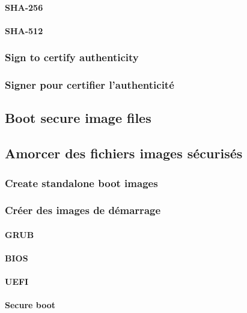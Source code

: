 \paragraph{SHA-256}

\paragraph{SHA-512}

\ml
{\subsubsection{Sign to certify authenticity}}
{\subsubsection{Signer pour certifier l’authenticité}}

\ml
{\subsection{Boot secure image files}}
{\subsection{Amorcer des fichiers images sécurisés}}

\ml
{\subsubsection{Create standalone boot images}}
{\subsubsection{Créer des images de démarrage}}

\paragraph{GRUB}

\paragraph{BIOS}

\paragraph{UEFI}

\paragraph{Secure boot}

